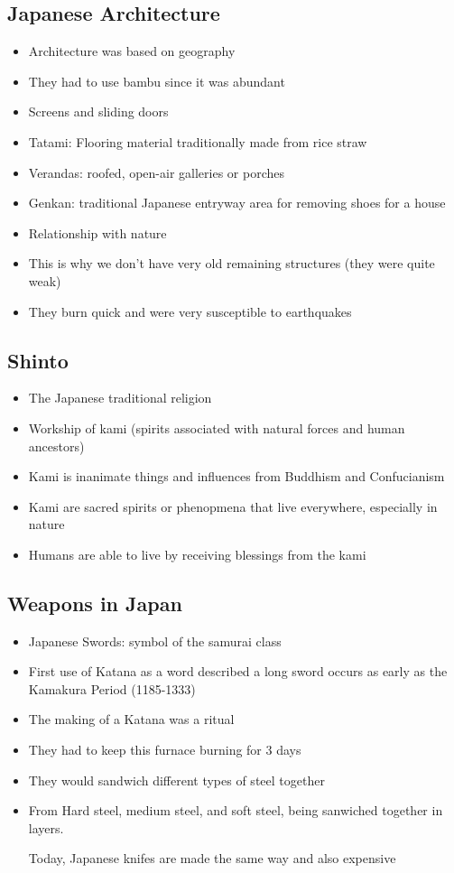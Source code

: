 \documentclass{article}
\begin{document}
\subsection{Japanese Architecture}
\begin{itemize}
  \item Architecture was based on geography
  \item They had to use bambu since it was abundant
  \item Screens and sliding doors
  \item Tatami: Flooring material traditionally made from rice straw
  \item Verandas: roofed, open-air galleries or porches
  \item Genkan: traditional Japanese entryway area for removing shoes for a house
  \item Relationship with nature
  \item This is why we don't have very old remaining structures (they were quite weak)
  \item They burn quick and were very susceptible to earthquakes
\end{itemize}

\subsection{Shinto}
\begin{itemize}
  \item The Japanese traditional religion
  \item Workship of kami (spirits associated with natural forces and human ancestors)
  \item Kami is inanimate things and influences from Buddhism and Confucianism
  \item Kami are sacred spirits or phenopmena that live everywhere, especially in nature
  \item Humans are able to live by receiving blessings from the kami
\end{itemize}

\subsection{Weapons in Japan}
\begin{itemize}
  \item Japanese Swords: symbol of the samurai class
  \item First use of Katana as a word described a long sword occurs as early
    as the Kamakura Period (1185-1333)
  \item The making of a Katana was a ritual
  \item They had to keep this furnace burning for 3 days
  \item They would sandwich different types of steel together
  \item From Hard steel, medium steel, and soft steel, being
    sanwiched together in layers.

    Today, Japanese knifes are made the same way and also expensive
\end{itemize}
\end{document}
